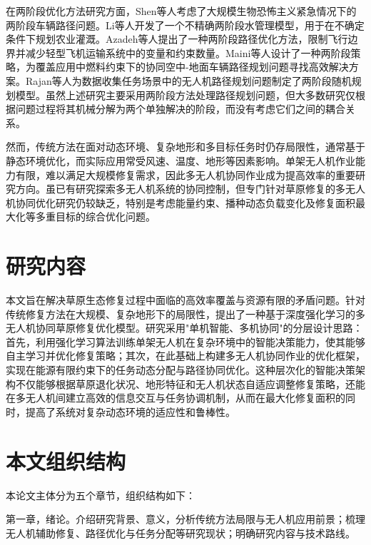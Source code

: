 \documentclass[AutoFakeBold]{LZUThesis}
\begin{document}
在两阶段优化方法研究方面，Shen等人\cite{shen2009two}考虑了大规模生物恐怖主义紧急情况下的两阶段车辆路径问题。Li等人\cite{li2010inexact}开发了一个不精确两阶段水管理模型，用于在不确定条件下规划农业灌溉。Azadeh等人\cite{azadeh2019two}提出了一种两阶段路径优化方法，限制飞行边界并减少轻型飞机运输系统中的变量和约束数量。Maini等人\cite{maini2019cooperative}设计了一种两阶段策略，为覆盖应用中燃料约束下的协同空中-地面车辆路径规划问题寻找高效解决方案。Rajan等人\cite{rajan2022routing}为数据收集任务场景中的无人机路径规划问题制定了两阶段随机规划模型。虽然上述研究主要采用两阶段方法处理路径规划问题，但大多数研究仅根据问题过程将其机械分解为两个单独解决的阶段，而没有考虑它们之间的耦合关系。

然而，传统方法在面对动态环境、复杂地形和多目标任务时仍存局限性\cite{gann2019international}，通常基于静态环境优化，而实际应用常受风速、温度、地形等因素影响\cite{blackburn2021monitoring}。单架无人机作业能力有限，难以满足大规模修复需求，因此多无人机协同作业成为提高效率的重要研究方向\cite{dorling2016vehicle,maini2019cooperative}。虽已有研究探索多无人机系统的协同控制\cite{buters2019seed}，但专门针对草原修复的多无人机协同优化研究仍较缺乏，特别是考虑能量约束、播种动态负载变化及修复面积最大化等多重目标的综合优化问题。

\section{研究内容}
本文旨在解决草原生态修复过程中面临的高效率覆盖与资源有限的矛盾问题。针对传统修复方法在大规模、复杂地形下的局限性，提出了一种基于深度强化学习的多无人机协同草原修复优化模型。研究采用"单机智能、多机协同"的分层设计思路：首先，利用强化学习算法训练单架无人机在复杂环境中的智能决策能力，使其能够自主学习并优化修复策略；其次，在此基础上构建多无人机协同作业的优化框架，实现在能源有限约束下的任务动态分配与路径协同优化。这种层次化的智能决策架构不仅能够根据草原退化状况、地形特征和无人机状态自适应调整修复策略，还能在多无人机间建立高效的信息交互与任务协调机制，从而在最大化修复面积的同时，提高了系统对复杂动态环境的适应性和鲁棒性。

\section{本文组织结构}

本论文主体分为五个章节，组织结构如下：

第一章，绪论。介绍研究背景、意义，分析传统方法局限与无人机应用前景；梳理无人机辅助修复、路径优化与任务分配等研究现状；明确研究内容与技术路线。
\end{document}

